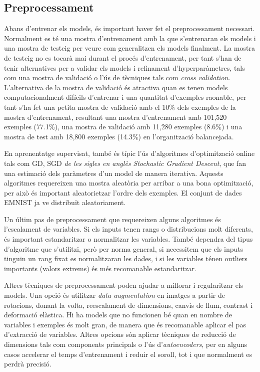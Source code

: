 \documentclass[12pt, spanish]{article}
\begin{document}
\subsection{Preprocessament}

Abans d'entrenar els models, és important haver fet el preprocessament necessari. Normalment es té una mostra d'entrenament amb la que s'entrenaran els models i una mostra de testeig per veure com generalitzen els models finalment. La mostra de testeig no es tocarà mai durant el procés d'entrenament, per tant s'han de tenir alternatives per a validar els models i refinament d'hyperparàmetres, tals com una mostra de validació o l'ús de tècniques tals com \textit{cross validation}. L'alternativa de la mostra de validació és atractiva quan es tenen models computacionalment difícils d'entrenar i una quantitat d'exemples raonable, per tant s'ha fet una petita mostra de validació amb el 10\% dels exemples de la mostra d'entrenament, resultant una mostra d'entrenament amb 101,520 exemples (77.1\%), una mostra de validació amb 11,280 exemples (8.6\%) i una mostra de test amb 18,800 exemples (14.3\%) en l'organització balancejada.

En aprenentatge supervisat, també és típic l'ús d'algoritmes d'optimització online tals com GD, SGD \textit{de les sigles en anglès \textit{Stochastic Gradient Descent}}, que fan una estimació dels paràmetres d'un model de manera iterativa. Aquests algoritmes requereixen una mostra aleatòria per arribar a una bona optimització, per això és important aleatorietzar l'ordre dels exemples. El conjunt de dades EMNIST ja ve distribuït aleatoriament. 

Un últim pas de preprocessament que requereixen alguns algoritmes és l'escalament de variables. Si els inputs tenen rangs o distribucions molt diferents, és important estandaritzar o normalitzar les variables. També dependra del tipus d'algoritme que s'utilitzi, però per norma general, si necessitem que els inputs tinguin un rang fixat es normalitzaran les dades, i si les variables ténen outliers importants (valors extrems) és més recomanable estandaritzar.

Altres tècniques de preprocessament poden ajudar a millorar i regularitzar els models. Una opció és utilitzar \textit{data augmentation} en imatges a partir de rotacions, donant la volta, reescalament de dimensions, canvis de llum, contrast i deformació elàstica. Hi ha models que no funcionen bé quan en nombre de variables i exemples és molt gran, de manera que és recomanable aplicar el pas d'extracció de variables. Altres opcions són aplicar tècniques de reducció de dimensions tals com components principals o l'ús d'\textit{autoencoders}, per en alguns casos accelerar el temps d'entrenament i reduir el soroll, tot i que normalment es perdrà precisió.
\end{document}

